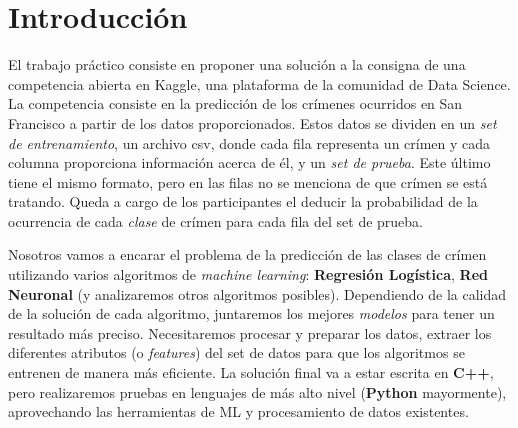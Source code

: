 \section{Introducción} %
\label{sec:introducci_n}

El trabajo práctico consiste en proponer una solución a la consigna de una competencia abierta en Kaggle, una plataforma de la comunidad de Data Science. La competencia consiste en la predicción de los crímenes ocurridos en San Francisco a partir de los datos proporcionados. Estos datos se dividen en un \textit{set de entrenamiento}, un archivo csv, donde cada fila representa un crímen y cada columna proporciona información acerca de él, y un \textit{set de prueba}. Este último tiene el mismo formato, pero en las filas no se menciona de que crímen se está tratando. Queda a cargo de los participantes el deducir la probabilidad de la ocurrencia de cada \textit{clase} de crímen para cada fila del set de prueba.


Nosotros vamos a encarar el problema de la predicción de las clases de crímen utilizando varios algoritmos de \textit{machine learning}: \textbf{Regresión Logística}, \textbf{Red Neuronal} (y analizaremos otros algoritmos posibles). Dependiendo de la calidad de la solución de cada algoritmo, juntaremos los mejores \textit{modelos} para tener un resultado más preciso. Necesitaremos procesar y preparar los datos, extraer los diferentes atributos (o \textit{features}) del set de datos para que los algoritmos se entrenen de manera más eficiente. La solución final va a estar escrita en \textbf{C++}, pero realizaremos pruebas en lenguajes de más alto nivel (\textbf{Python} mayormente), aprovechando las herramientas de ML y procesamiento de datos existentes.

